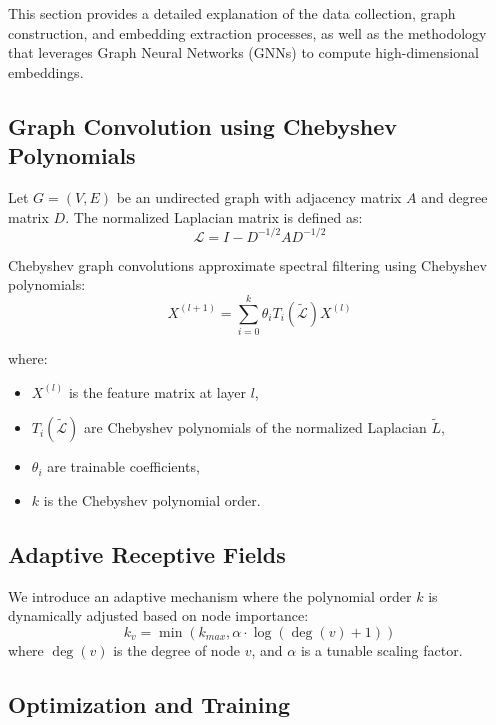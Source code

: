 This section provides a detailed explanation of the data collection, graph construction, and embedding extraction processes, as well as the methodology that leverages Graph Neural Networks (GNNs) to compute high-dimensional embeddings.
\subsection{Graph Convolution using Chebyshev Polynomials}
Let \( G = (V, E) \) be an undirected graph with adjacency matrix \( A \) and degree matrix \( D \). The normalized Laplacian matrix is defined as:
\begin{equation}
	\mathcal{L} = I - D^{-1/2} A D^{-1/2}
\end{equation}

Chebyshev graph convolutions approximate spectral filtering using Chebyshev polynomials:
\begin{equation}
	X^{(l+1)} = \sum_{i=0}^{k} \theta_i T_i(\tilde{\mathcal{L}}) X^{(l)}
\end{equation}

where:
\begin{itemize}
	\item $X^{(l)}$ is the feature matrix at layer $l$,
	\item $T_i(\tilde{\mathcal{L}})$ are Chebyshev polynomials of the normalized Laplacian $\tilde{L}$,
	\item $\theta_i$ are trainable coefficients,
	\item $k$ is the Chebyshev polynomial order.
\end{itemize}



\subsection{Adaptive Receptive Fields}
We introduce an adaptive mechanism where the polynomial order \( k \) is dynamically adjusted based on node importance:
\begin{equation}
	k_v = \min(k_{max}, \alpha \cdot \log(\deg(v) + 1))
\end{equation}
where \( \deg(v) \) is the degree of node \( v \), and \( \alpha \) is a tunable scaling factor.


\subsection{Optimization and Training}

